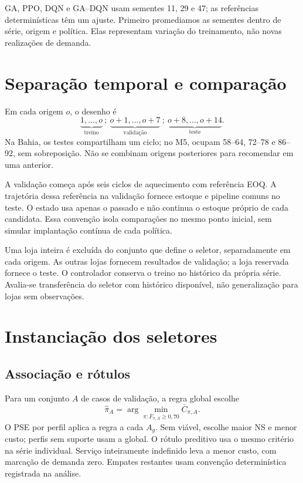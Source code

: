 GA, PPO, DQN e GA--DQN usam sementes 11, 29 e 47; as referências determinísticas têm um ajuste. Primeiro promediamos as sementes dentro de série, origem e política. Elas representam variação do treinamento, não novas realizações de demanda.

\section{Separação temporal e comparação}
\label{sec:simulacao_benchmark}\label{sec:wf_protocol}
Em cada origem $o$, o desenho é
\begin{equation}
 \underbrace{1,\ldots,o}_{\text{treino}}\ ;\
 \underbrace{o+1,\ldots,o+7}_{\text{validação}}\ ;\
 \underbrace{o+8,\ldots,o+14}_{\text{teste}}.
 \label{eq:wf_splits}
\end{equation}
Na Bahia, os testes compartilham um ciclo; no M5, ocupam 58--64, 72--78 e 86--92, sem sobreposição. Não se combinam origens posteriores para recomendar em uma anterior.

A validação começa após seis ciclos de aquecimento com referência EOQ. A trajetória dessa referência na validação fornece estoque e pipeline comuns no teste. O estado usa apenas o passado e não continua o estoque próprio de cada candidata. Essa convenção isola comparações no mesmo ponto inicial, sem simular implantação contínua de cada política.

Uma loja inteira é excluída do conjunto que define o seletor, separadamente em cada origem. As outras lojas fornecem resultados de validação; a loja reservada fornece o teste. O controlador conserva o treino no histórico da própria série. Avalia-se transferência do seletor com histórico disponível, não generalização para lojas sem observações.

\section{Instanciação dos seletores}
\label{sec:selecao_contextual}
\subsection{Associação e rótulos}
Para um conjunto $A$ de casos de validação, a regra global escolhe
\begin{equation}
 \hat\pi_A=\arg\min_{\pi:\bar F_{\pi,A}\geq0{,}70}\bar C_{\pi,A}.
 \label{eq:policy_selector}
\end{equation}
O PSE por perfil aplica a regra a cada $A_g$. Sem viável, escolhe maior NS e menor custo; perfis sem suporte usam a global. O rótulo preditivo usa o mesmo critério na série individual. Serviço inteiramente indefinido leva a menor custo, com marcação de demanda zero. Empates restantes usam convenção determinística registrada na análise.

